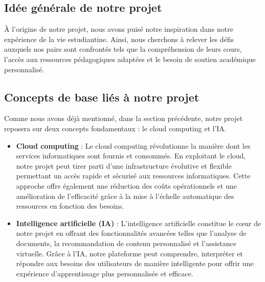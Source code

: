 \subsection{Idée générale de notre projet}
À l'origine de notre projet, nous avons puisé notre inspiration dans notre expérience de la vie estudiantine. Ainsi, nous cherchons à relever les défis auxquels nos pairs sont confrontés tels que la compréhension de leurs cours, l’accès aux ressources pédagogiques adaptées et le besoin de soutien académique personnalisé.

\vspace{0.5em}

\vspace{0.5em}

\subsection{Concepts de base liés à notre projet} 
Comme nous avons déjà mentionné, dans la section précédente, notre projet reposera sur deux concepts fondamentaux : le cloud computing et l’IA.

\begin{itemize}[itemsep=2pt, parsep=2pt]
    \item \textbf{Cloud computing} : Le cloud computing révolutionne la manière dont les services informatiques sont fournis et consommés. En exploitant le cloud, notre projet peut tirer parti d'une infrastructure évolutive et flexible permettant un accès rapide et sécurisé aux ressources informatiques. Cette approche offre également une réduction des coûts opérationnels et une amélioration de l'efficacité grâce à la mise à l'échelle automatique des ressources en fonction des besoins.
    \item \textbf{Intelligence artificielle (IA)} : L'intelligence artificielle constitue le cœur de notre projet en offrant des fonctionnalités avancées telles que l'analyse de documents, la recommandation de contenu personnalisé et l'assistance virtuelle. Grâce à l'IA, notre plateforme peut comprendre, interpréter et répondre aux besoins des utilisateurs de manière intelligente pour offrir une expérience d'apprentissage plus personnalisée et efficace.
\end{itemize}

